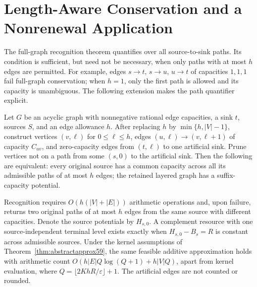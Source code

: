 \section{Length-Aware Conservation and a Nonrenewal Application}\label{sec:bounded60}
The full-graph recognition theorem quantifies over all source-to-sink paths. Its condition is sufficient, but need not be necessary, when only paths with at most $h$ edges are permitted. For example, edges $s\to t$, $s\to u$, $u\to t$ of capacities $1,1,1$ fail full-graph conservation; when $h=1$, only the first path is allowed and its capacity is unambiguous. The following extension makes the path quantifier explicit.

\begin{theorem}\label{thm:bounded60}
Let $G$ be an acyclic graph with nonnegative rational edge capacities, a sink $t$, sources $S$, and an edge allowance $h$. After replacing $h$ by $\min\{h,|V|-1\}$, construct vertices $(v,\ell)$ for $0\leq\ell\leq h$, edges $(u,\ell)\to(v,\ell+1)$ of capacity $C_{uv}$, and zero-capacity edges from $(t,\ell)$ to one artificial sink. Prune vertices not on a path from some $(s,0)$ to the artificial sink. Then the following are equivalent: every original source has a common capacity across all its admissible paths of at most $h$ edges; the retained layered graph has a suffix-capacity potential.

Recognition requires $O(h(|V|+|E|))$ arithmetic operations and, upon failure, returns two original paths of at most $h$ edges from the same source with different capacities. Denote the source potentials by $H_{s,0}$. A complement resource with one source-independent terminal level exists exactly when $H_{s,0}-B_s=R$ is constant across admissible sources. Under the kernel assumptions of Theorem~\ref{thm:abstractapprox59}, the same feasible additive approximation holds with arithmetic count
$O(h|E|Q\log(Q+1)+h|V|Q)$, apart from kernel evaluation, where $Q=\lfloor2KhR/\varepsilon\rfloor+1$. The artificial edges are not counted or rounded.
\end{theorem}
